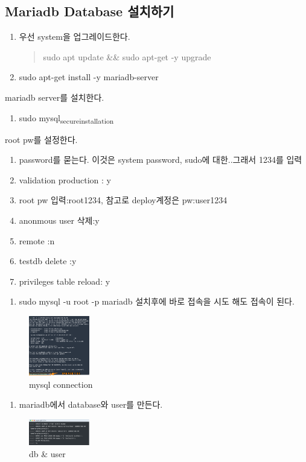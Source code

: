 \documentclass[11pt]{article}
\begin{document}
\subsection{Mariadb Database 설치하기}
\label{sec:orgea43c1c}
\begin{enumerate}
\item 우선 system을 업그레이드한다.
\begin{quote}
sudo apt update \&\& sudo apt-get -y upgrade
\end{quote}

\item sudo apt-get install -y mariadb-server
\end{enumerate}
mariadb server를 설치한다.
\begin{enumerate}
\item sudo mysql\textsubscript{secure}\textsubscript{installation}
\end{enumerate}
root pw를 설정한다.
\begin{enumerate}
\item password를 묻는다. 이것은 system password, sudo에 대한..그래서 1234를 입력
\item validation production : y
\item root pw 입력:root1234, 참고로 deploy계정은 pw:user1234
\item anonmous user 삭제:y
\item remote :n
\item testdb delete :y
\item privileges table reload: y
\end{enumerate}
\begin{enumerate}
\item sudo mysql -u root -p
mariadb 설치후에 바로 접속을 시도 해도 접속이 된다.
\end{enumerate}
\begin{figure}[htbp]
\centering
\includegraphics[width=100px]{./img/connection.png}
\caption{\label{fig:org66de6af}mysql connection}
\end{figure}

\begin{enumerate}
\item mariadb에서 database와 user를 만든다.
\end{enumerate}
\begin{figure}[htbp]
\centering
\includegraphics[width=100px]{./img/db_create.png}
\caption{\label{fig:org3b8b270}db \& user}
\end{figure}
\end{document}
